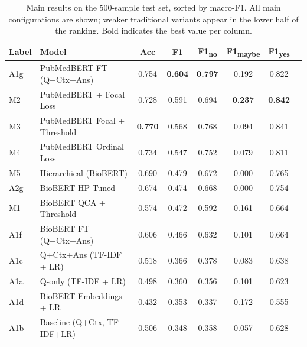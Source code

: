 \documentclass[11pt]{article}
\renewcommand{\arraystretch}{1.08}
\begin{document}
\begin{table}[t]
\centering
\caption{Main results on the 500-sample test set, sorted by macro-F1. All main configurations are shown; weaker traditional variants appear in the lower half of the ranking. Bold indicates the best value per column.}
\label{tab:results}
\renewcommand{\arraystretch}{1.15}
\setlength{\tabcolsep}{8pt}
\begin{tabular}{llcccccc}
\toprule
\textbf{Label} & \textbf{Model} & \textbf{Acc} & \textbf{F1} & \textbf{F1\textsubscript{no}} & \textbf{F1\textsubscript{maybe}} & \textbf{F1\textsubscript{yes}} \\
\midrule
A1g           & PubMedBERT FT (Q+Ctx+Ans)     & 0.754          & \textbf{0.604} & \textbf{0.797} & 0.192          & 0.822 \\
M2            & PubMedBERT + Focal Loss       & 0.728          & 0.591          & 0.694          & \textbf{0.237} & \textbf{0.842} \\
M3            & PubMedBERT Focal + Threshold  & \textbf{0.770} & 0.568          & 0.768          & 0.094          & 0.841 \\
M4            & PubMedBERT Ordinal Loss       & 0.734          & 0.547          & 0.752          & 0.079          & 0.811 \\
\midrule
M5            & Hierarchical (BioBERT)        & 0.690          & 0.479          & 0.672          & 0.000          & 0.765 \\
A2g           & BioBERT HP-Tuned              & 0.674          & 0.474          & 0.668          & 0.000          & 0.754 \\
M1            & BioBERT QCA + Threshold       & 0.574          & 0.472          & 0.592          & 0.161          & 0.664 \\
A1f           & BioBERT FT (Q+Ctx+Ans)        & 0.606          & 0.466          & 0.632          & 0.101          & 0.664 \\
\midrule
A1c           & Q+Ctx+Ans (TF-IDF + LR)       & 0.518          & 0.366          & 0.378          & 0.083          & 0.638 \\
A1a           & Q-only (TF-IDF + LR)          & 0.498          & 0.360          & 0.356          & 0.101          & 0.623 \\
A1d           & BioBERT Embeddings + LR       & 0.432          & 0.353          & 0.337          & 0.172          & 0.555 \\
A1b           & Baseline (Q+Ctx, TF-IDF+LR)   & 0.506          & 0.348          & 0.358          & 0.057          & 0.628 \\

\end{tabular}
\end{table}
\end{document}
